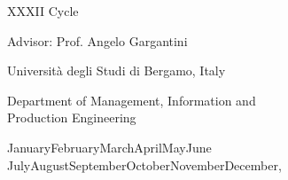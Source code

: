 \documentclass[
12pt, %
oneside, %
english, %
singlespacing, %
headsepline, %
consistentlayout, %
]{MastersDoctoralThesis} %
\theoremstyle{plain}
\theoremstyle{definition}
\theoremstyle{remark}
\theoremstyle{remark}
\theoremstyle{plain}
\theoremstyle{plain}
\theoremstyle{remark}
\begin{document}
\begin{titlepage}
\begin{center}
	XXXII Cycle
    
    \vspace{\fill}
    
    {\large Advisor: Prof. Angelo Gargantini \\}
    
   
    
    \vspace{0.3cm}
    
    \vspace{\fill}
    
    {\large Universit\`a degli Studi di Bergamo, Italy
    
   Department of Management, Information and \\Production Engineering\\}
    
    \vspace{.5cm}
    
    {\large
    	\ifcase\month\or
    	January\or February\or March\or April\or May\or June\or
    	July\or August\or September\or October\or November\or December\fi,
    	\number\year
    }
    
   
    
    
    
  \end{center}
\end{titlepage}



\clearpage

\end{document}
